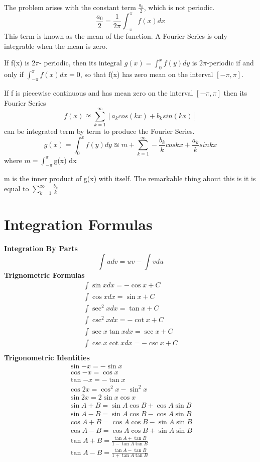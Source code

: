 \documentclass{article}
\begin{document}
The problem arises with the constant term $\frac{a_0}{2}$, which is not periodic.
\[
   \frac{a_0}{2} = \frac{1}{2\pi} \int_{-\pi}^{\pi} f(x) dx
\]
This term is known as the mean of the function. A Fourier Series is only integrable when the mean is zero.
\begin{lemma}
   If f(x)  is $2\pi$- periodic, then its integral $g(x) = \int_0^{x} f(y) dy$ is $2\pi$-periodic if and only if $\int_{-\pi}^\pi f(x) dx = 0$, so that f(x) has zero mean on the interval $[-\pi,\pi]$.
\end{lemma}
\begin{theorem}
   If f is piecewise continuous and has mean zero on the interval $[-\pi,\pi]$ then its Fourier Series  
	\begin{displaymath}
	   f(x) \approxeq \sum_{k=1}^{\infty} [a_k cos(kx) + b_k sin(kx)]
	\end{displaymath}
	can be integrated term by term to produce the Fourier Series. 
	\[
	   g(x) = \int_0^{x} f(y) dy \approxeq m + \sum_{k=1}^{\infty} - \frac{b_k}{k} cos kx + \frac{a_k}{k} sin kx
	\]
	where $m = \int_{-\pi}^{\pi}$g(x) dx
\end{theorem}
\begin{note}
   m is the inner product of g(x) with itself. The remarkable thing about this is it is equal to $\sum_{k=1}^{\infty} \frac{b_k}{k}$
\end{note}
\section{Integration Formulas} %
\textbf{Integration By Parts}
\[
   \int u dv = uv - \int v du
\]
\label{sec:}
\textbf{Trignometric Formulas}
\begin{align*}
   \int \sin{x} dx = - \cos{x} + C \\
   \int \cos{x} dx = \sin{x} + C \\
   \int \sec^2{x} dx = \tan{x} + C \\ 
   \int \csc^2{x} dx = -\cot{x} + C \\ 
   \int \sec{x} \tan{x} dx = \sec{x} + C \\ 
   \int \csc{x} \cot{x} dx = -\csc{x} + C \\
\end{align*}
\textbf{Trigonometric Identities}
\begin{align*}
   \sin{-x} = -\sin{x} \\
   \cos{-x} = \cos{x} \\
   \tan{-x} = -\tan{x} \\ 
   \cos{2x} = \cos^2{x} - \sin^2{x} \\
   \sin{2x} = 2 \sin{x} \cos{x} \\ 
   \sin{A + B} = \sin{A}\cos{B} + \cos{A}\sin{B}\\
   \sin{A - B} = \sin{A}\cos{B} - \cos{A}\sin{B} \\
   \cos{A + B} = \cos{A}\cos{B} - \sin{A}\sin{B} \\
   \cos{A - B} = \cos{A}\cos{B} + \sin{A}\sin{B} \\
   \tan{A + B} = \frac{\tan{A} + \tan{B}}{1-\tan{A}\tan{B}} \\
   \tan{A - B} = \frac{\tan{A} - \tan{B}}{1+\tan{A}\tan{B}} \\
\end{align*} 
\end{document}
